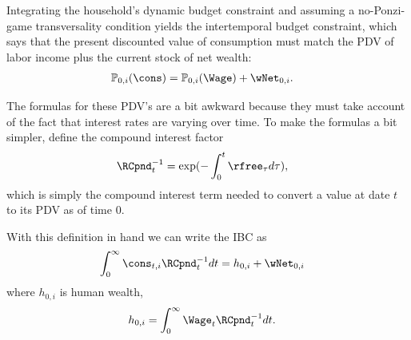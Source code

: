 \documentclass{handout}
\begin{document}
Integrating the household's dynamic budget constraint and assuming 
a no-Ponzi-game transversality condition yields the 
intertemporal budget constraint, which says that the present 
discounted value of consumption must match the PDV of labor
income plus the current stock of net wealth:
\begin{equation}\begin{gathered}\begin{aligned}
        \mathbb{P}_{0,i}(\cons) & =  \mathbb{P}_{0,i}(\Wage)+\wNet_{0,i}.
\end{aligned}\end{gathered}\end{equation}  

The formulas for these PDV's are a bit awkward because they must
take account of the fact that interest rates are varying over time.
To make the formulas a bit simpler, define the compound interest factor
\begin{equation}\begin{gathered}\begin{aligned}
        \RCpnd_{t}^{-1} & =  \exp(-\int_{0}^{t} \rfree_{\tau} d\tau),
\end{aligned}\end{gathered}\end{equation}
which is simply the compound interest term needed to convert a value 
at date $t$ to its PDV as of time 0.

With this definition in hand we can write the IBC as
\begin{equation}\begin{gathered}\begin{aligned}
        \int_{0}^{\infty} \cons_{t,i} \RCpnd^{-1}_{t} dt & =  h_{0,i}+ \wNet_{0,i}
\end{aligned}\end{gathered}\end{equation}
where $h_{0,i}$ is human wealth,
\begin{equation}\begin{gathered}\begin{aligned}
        h_{0,i} & =  \int_{0}^{\infty} \Wage_{t} \RCpnd^{-1}_{t} dt. \label{eq:humwealth}
\end{aligned}\end{gathered}\end{equation}
\end{document}
